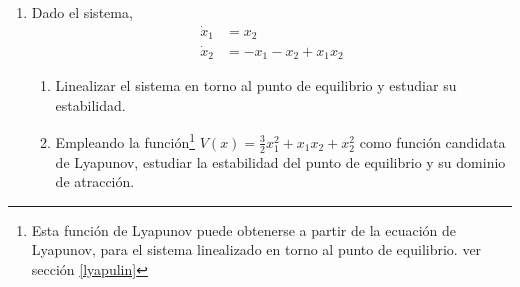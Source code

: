 \begin{enumerate}
\item Dado el sistema,
\begin{align*}
\dot x_1 &= x_2\\
\dot x_2 &= -x_1 -x_2 + x_1x_2
\end{align*}
\begin{enumerate}
\item Linealizar el sistema en torno al punto de equilibrio y estudiar su estabilidad.
\item Empleando la función\footnote{Esta función de Lyapunov puede obtenerse a partir de la ecuación de Lyapunov, para el sistema linealizado en torno al punto de equilibrio. ver sección \ref{lyapulin}} $V(x)=\frac{3}{2}x_1^2+x_1x_2+x_2^2$ como función candidata de Lyapunov, estudiar la estabilidad del punto de equilibrio y su dominio de atracción.
\end{enumerate}
  
\end{enumerate}